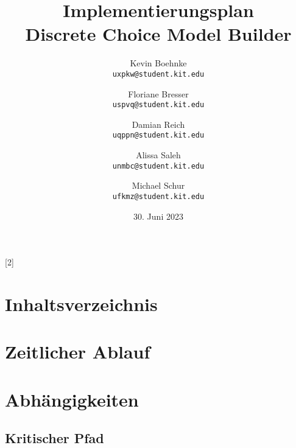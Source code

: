 \documentclass{article}
\title{Implementierungsplan \\ \large Discrete Choice Model Builder}
\author{Kevin Boehnke \\ \texttt{uxpkw@student.kit.edu}
\and Floriane Bresser \\ \texttt{uspvq@student.kit.edu}
\and Damian Reich \\ \texttt{uqppn@student.kit.edu}
\and Alissa Saleh \\ \texttt{unmbc@student.kit.edu}
\and Michael Schur \\ \texttt{ufkmz@student.kit.edu}}
\date{30. Juni 2023}
\begin{document}
\maketitle
\thispagestyle{empty}
\newpage
\startcontents[maintableofcontents]
[2]{\section*{Inhaltsverzeichnis}}
\thispagestyle{empty}
\newpage
{}

\section{Zeitlicher Ablauf}

\section{Abhängigkeiten}


\subsection{Kritischer Pfad}



\clearpage
\printunsrtglossary
\end{document}
